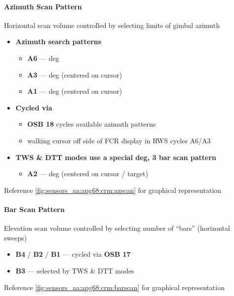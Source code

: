 \paragraph{Azimuth Scan Pattern}
Horizontal scan volume controlled by selecting limits of gimbal azimuth
\begin{itemize}
    \item \textbf{Azimuth search patterns}
    \begin{itemize}
        \item \textbf{A6} ---  deg
        \item \textbf{A3} ---  deg (centered on cursor)
        \item \textbf{A1} ---  deg (centered on cursor)
    \end{itemize}
    \item \textbf{Cycled via}
    \begin{itemize}
        \item \textbf{OSB 18} cycles available azimuth patterns
        \item walking cursor off side of FCR display in RWS cycles A6/A3
    \end{itemize}
    \item \textbf{TWS \& DTT modes use a special  deg,
    3 bar scan pattern}
    \begin{itemize}
        \item \textbf{A2} ---  deg (centered on cursor / target)
    \end{itemize}
\end{itemize}

Reference \cref{fig:sensors_aa:apg68:crm:azscan} for graphical representation

\paragraph{Bar Scan Pattern}
Elevation scan volume controlled by selecting number of ``bars'' (horizontal sweeps)
\begin{itemize}
    \item \textbf{B4} / \textbf{B2} / \textbf{B1} --- cycled via \textbf{OSB 17}
    \item \textbf{B3} --- selected by TWS \& DTT modes
\end{itemize}

Reference \cref{fig:sensors_aa:apg68:crm:barscan} for graphical representation

